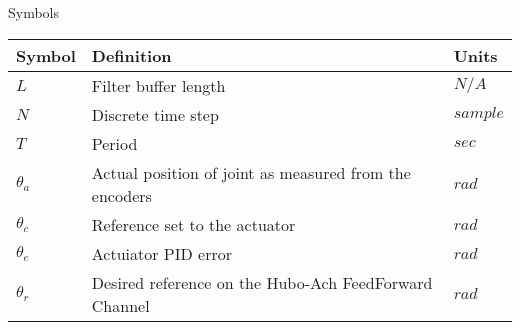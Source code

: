 \Large
\centering
Symbols\\
\normalsize
\begin{tabular}{l | l | l}
\hline
Symbol     & Definition                                                & Units \\
\hline
$L$        & Filter buffer length                                      & $N/A$\\
\hline
$N$        & Discrete time step                                        & $sample$\\
\hline
$T$        & Period                                                    & $sec$ \\
\hline
$\theta_a$ & Actual position of joint as measured from the encoders    & $rad$ \\
\hline
$\theta_c$ & Reference set to the actuator                             & $rad$ \\
\hline
$\theta_e$ & Actuiator PID error                                       & $rad$ \\
\hline
$\theta_r$ & Desired reference on the Hubo-Ach FeedForward Channel     & $rad$ \\
\hline

\end{tabular}
